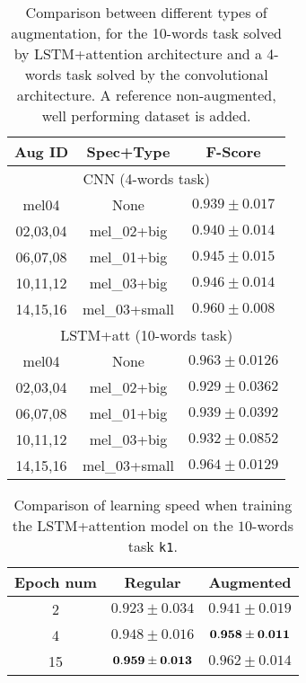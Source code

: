 \begin{table}[t!]
    \centering
    \caption{Comparison between different types of augmentation,
    for the 10-words task solved by LSTM+attention architecture and a
    4-words task solved by the convolutional architecture.
    A reference non-augmented, well performing dataset is added.}
    \label{tab:augmentation_comparison_performance}
    \begin{tabular}{|cc|c|}
        \hline
        Aug ID & Spec+Type & F-Score \\
        \hline
        \hline
        \multicolumn{3}{|c|}{CNN (4-words task)} \\
        \hline
        mel04 & None & $0.939 \pm 0.017$ \\
        02,03,04 & mel\_02+big   & $0.940 \pm 0.014$ \\
        06,07,08 & mel\_01+big   & $0.945 \pm 0.015$ \\
        10,11,12 & mel\_03+big   & $0.946 \pm 0.014$ \\
        14,15,16 & mel\_03+small & $0.960 \pm 0.008$ \\
        \hline
        \hline
        \multicolumn{3}{|c|}{LSTM+att (10-words task)} \\
        \hline
        mel04   &  None & $0.963 \pm 0.0126$ \\
        02,03,04 & mel\_02+big   &  $0.929 \pm 0.0362$ \\
        06,07,08 & mel\_01+big   &  $0.939 \pm 0.0392$ \\
        10,11,12 & mel\_03+big   &  $0.932 \pm 0.0852$ \\
        14,15,16 & mel\_03+small &  $0.964 \pm 0.0129$ \\
        \hline
    \end{tabular}
\end{table}

\begin{table}[t!]
    \centering
    \caption{Comparison of learning speed when training the LSTM+attention
    model on the $10$-words task \texttt{k1}.}
    \label{tab:augmentation_learning_speed}
    \begin{tabular}{|c|c|c|}
        \hline
        Epoch num & Regular & Augmented \\
        \hline
        2  & $0.923 \pm 0.034$      & $0.941 \pm 0.019$ \\
        4  & $0.948 \pm 0.016$      & $\bf{0.958} \pm 0.011$ \\
        15 & $\bf{0.959} \pm 0.013$ & $0.962 \pm 0.014$ \\
        \hline
    \end{tabular}
\end{table}


